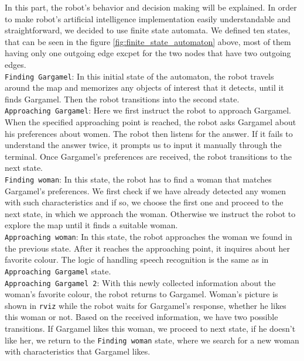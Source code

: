 \documentclass[12pt,a4paper]{article}
\begin{document}
	In this part, the robot's behavior and decision making will be explained. In order to make robot's artificial intelligence implementation easily understandable and straightforward, we decided to use finite state automata. We defined ten states, that can be seen in the figure \ref{fig:finite_state_automaton} above, most of them having only one outgoing edge excpet for the two nodes that have two outgoing edges. \\

	\texttt{Finding Gargamel}: In this initial state of the automaton, the robot travels around the map and memorizes any objects of interest that it detects, until it finds Gargamel. Then the robot transitions into the second state. \\

	\texttt{Approaching Gargamel}: Here we first instruct the robot to approach Gargamel. When the specified approaching point is reached, the robot asks Gargamel about his preferences about women. The robot then listens for the answer. If it fails to understand the answer twice, it prompts us to input it manually through the terminal. Once Gargamel's preferences are received, the robot transitions to the next state. \\

	\texttt{Finding woman}: In this state, the robot has to find a woman that matches Gargamel's preferences. We first check if we have already detected any women with such characteristics and if so, we choose the first one and proceed to the next state, in which we approach the woman. Otherwise we instruct the robot to explore the map until it finds a suitable woman. \\

	\texttt{Approaching woman}: In this state, the robot approaches the woman we found in the previous state. After it reaches the approaching point, it inquires about her favorite colour. The logic of handling speech recognition is the same as in \texttt{Approaching Gargamel} state. \\

	\texttt{Approaching Gargamel 2}: With this newly collected information about the woman's favorite colour, the robot returns to Gargamel. Woman's picture is shown in \texttt{rviz} while the robot waits for Gargamel's response, whether he likes this woman or not. Based on the received information, we have two possible transitions. If Gargamel likes this woman, we proceed to next state, if he doesn't like her, we return to the \texttt{Finding woman} state, where we search for a new woman with characteristics that Gargamel likes. \\
\end{document}
